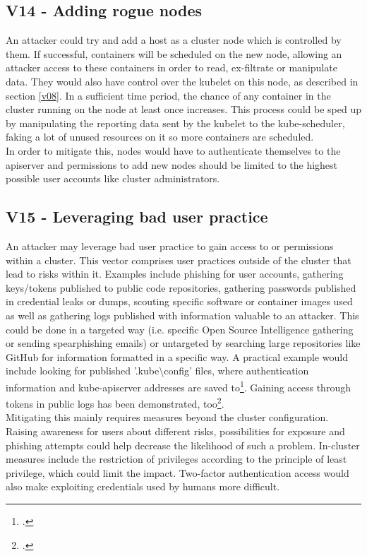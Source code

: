 \subsection{V14 - Adding rogue nodes}
\vspace{-0.25cm}
An attacker could try and add a host as a cluster node which is controlled by them. If successful, containers will be scheduled on the new node, allowing an attacker access to these containers in order to read, ex-filtrate or manipulate data. They would also have control over the kubelet on this node, as described in section \ref{v08}.
In a sufficient time period, the chance of any container in the cluster running on the node at least once increases. This process could be sped up by manipulating the reporting data sent by the kubelet to the kube-scheduler, faking a lot of unused resources on it so more containers are scheduled. \\
In order to mitigate this, nodes would have to authenticate themselves to the apiserver and permissions to add new nodes should be limited to the highest possible user accounts like cluster administrators.

\vspace{-0.25cm}
\subsection{V15 - Leveraging bad user practice}
\vspace{-0.25cm}
An attacker may leverage bad user practice to gain access to or permissions within a cluster. 
This vector comprises user practices outside of the cluster that lead to risks within it.
Examples include phishing for user accounts, gathering keys/tokens published to public code repositories, gathering passwords published in credential leaks or dumps, scouting specific software or container images used as well as gathering logs published with information valuable to an attacker.
This could be done in a targeted way (i.e. specific Open Source Intelligence gathering or sending spearphishing emails) or untargeted by searching large repositories like GitHub for information formatted in a specific way. A practical example would include looking for published '.kube\textbackslash config' files, where authentication information and kube-apiserver addresses are saved to\footcite[][, section 'Define clusters, users, and contexts']{kubectlClusterAccess}. Gaining access through tokens in public logs has been demonstrated, too\footcite[][, section 'Results and notable findings']{ciKnew}. \\
Mitigating this mainly requires measures beyond the cluster configuration. Raising awareness for users about different risks, possibilities for exposure and phishing attempts  could help decrease the likelihood of such a problem. In-cluster measures include the restriction of privileges according to the principle of least privilege, which could limit the impact. Two-factor authentication access would also make exploiting credentials used by humans more difficult.

